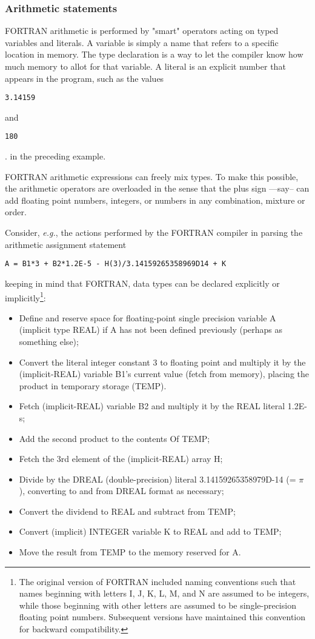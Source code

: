 \subsubsection{Arithmetic statements}
 
FORTRAN arithmetic is performed by "smart" operators acting on typed variables and literals. A variable is simply a name that refers to a specific location in memory. The type declaration is a way to let the compiler know how much memory to allot for that variable. A literal is an explicit number that appears in the program, such as the values \begin{verbatim}3.14159\end{verbatim} and \begin{verbatim}180\end{verbatim}. in the preceding example.

FORTRAN arithmetic expressions can freely mix types. To make this possible, the arithmetic operators are overloaded in the sense that the plus sign —say-- can add floating point numbers, integers, or numbers in any combination, mixture or order.

Consider, \textit{e.g.}, the actions performed by the FORTRAN compiler in parsing the arithmetic assignment statement 

\begin{verbatim}
A = B1*3 + B2*1.2E-5 - H(3)/3.14159265358969D14 + K
\end{verbatim}

keeping in mind that FORTRAN, data types can be declared explicitly or implicitly\footnote{The original version of FORTRAN included naming conventions such that names beginning with letters I, J, K, L, M, and N are assumed to be integers, while those beginning with other letters are assumed to be single-precision floating point numbers. Subsequent versions have maintained this convention for backward compatibility.}:
\begin{itemize}
    \item Define and reserve space for floating-point single precision variable A (implicit type REAL) if A has not been defined previously (perhaps as something else);
    \item Convert the literal integer constant 3 to floating point and multiply it by the (implicit-REAL) variable B1's current value (fetch from memory), placing the product in temporary storage (TEMP).
    \item Fetch (implicit-REAL) variable B2 and multiply it by the REAL literal 1.2E-s;
    \item Add the second product to the contents Of TEMP;
    \item Fetch the 3rd element of the (implicit-REAL) array H;
    \item Divide by the DREAL (double-precision) literal 3.14159265358979D-14 (= $\pi$ ), converting to and from DREAL format as necessary;
    \item Convert the dividend to REAL and subtract from TEMP;
    \item Convert (implicit) INTEGER variable K to REAL and add to TEMP;
    \item Move the result from TEMP to the memory reserved for A.
\end{itemize}

